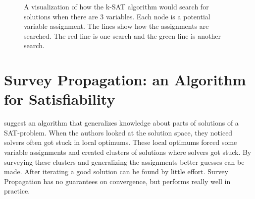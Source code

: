 \documentclass[msc,lith,english]{liuthesis}
\begin{document}
\begin{center}
\begin{figure}[h!]
\centering
{}
\caption{A visualization of how the k-SAT algorithm would search for solutions when there are 3 variables. Each node is a potential variable assignment. The lines show how the assignments are searched. The red line is one search and the green line is another search.}
\label{figKSATSearch}
\end{figure}
\end{center}

\newpage
\section{Survey Propagation: an Algorithm for Satisfiability}
\citeauthor{sourceSurveyProp} \cite{sourceSurveyProp} suggest an algorithm that generalizes knowledge about parts of solutions of a SAT-problem. 
When the authors looked at the solution space, they noticed solvers often got stuck in local optimums.
These local optimums forced some variable assignments and created clusters of solutions where solvers got stuck.
By surveying these clusters and generalizing the assignments better guesses can be made.
After iterating a good solution can be found by little effort.
Survey Propagation has no guarantees on convergence, but performs really well in practice.
\end{document}
